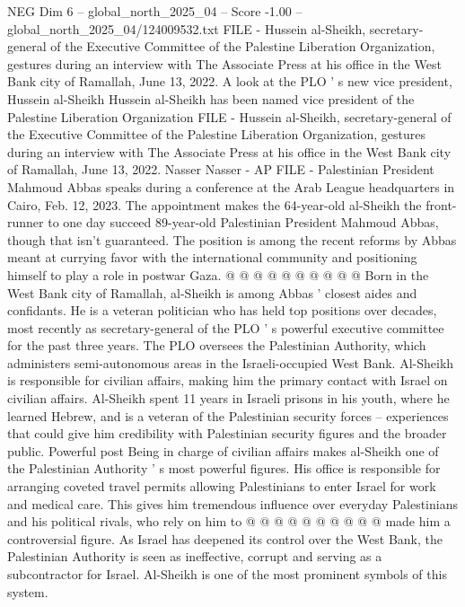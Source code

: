 \begin{textsample}{NEG Dim 6 – global\_north\_2025\_04 – Score -1.00 – global\_north\_2025\_04/124009532.txt}  \label{ex:f6_neg_258}
FILE - Hussein al-Sheikh, secretary-general of the Executive Committee of the Palestine Liberation Organization, gestures during an interview with The Associate Press at his office in the West Bank city of Ramallah, June 13, 2022.
A look at the PLO ' s new vice president, Hussein al-Sheikh Hussein al-Sheikh has been named vice president of the Palestine Liberation Organization FILE - Hussein al-Sheikh, secretary-general of the Executive Committee of the Palestine Liberation Organization, gestures during an interview with The Associate Press at his office in the West Bank city of Ramallah, June 13, 2022.
Nasser Nasser - AP FILE - Palestinian President Mahmoud Abbas speaks during a conference at the Arab League headquarters in Cairo, Feb. 12, 2023.
The appointment makes the 64-year-old al-Sheikh the front-runner to one day succeed 89-year-old Palestinian President Mahmoud Abbas, though that isn't guaranteed.
The position is among the recent reforms by Abbas meant at currying favor with the international community and positioning himself to play a role in postwar Gaza. @ @ @ @ @ @ @ @ @ @ Born in the West Bank city of Ramallah, al-Sheikh is among Abbas ' closest aides and confidants.
He is a veteran politician who has held top positions over decades, most recently as secretary-general of the PLO ' s powerful executive committee for the past three years.
The PLO oversees the Palestinian Authority, which administers semi-autonomous areas in the Israeli-occupied West Bank.
Al-Sheikh is responsible for civilian affairs, making him the primary contact with Israel on civilian affairs.
Al-Sheikh spent 11 years in Israeli prisons in his youth, where he learned Hebrew, and is a veteran of the Palestinian security forces -- experiences that could give him credibility with Palestinian security figures and the broader public.
Powerful post Being in charge of civilian affairs makes al-Sheikh one of the Palestinian Authority ' s most powerful figures.
His office is responsible for arranging coveted travel permits allowing Palestinians to enter Israel for work and medical care.
This gives him tremendous influence over everyday Palestinians and his political rivals, who rely on him to @ @ @ @ @ @ @ @ @ @ made him a controversial figure.
As Israel has deepened its control over the West Bank, the Palestinian Authority is seen as ineffective, corrupt and serving as a subcontractor for Israel.
Al-Sheikh is one of the most prominent symbols of this system.

\end{textsample}
